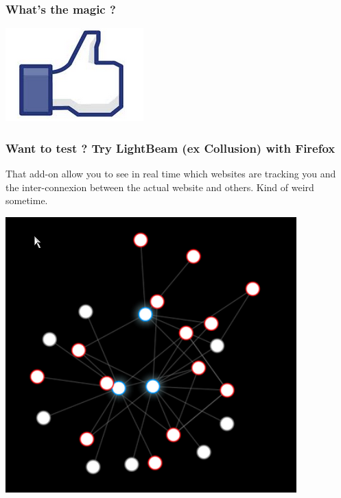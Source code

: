 \begin{frame}
\frametitle{What's the magic ?}

\begin{center}
\includegraphics[scale=0.3] {./materials/Facebook_like.png}
\end{center}
\end{frame}

\begin{frame}
\frametitle{Want to test ? Try LightBeam (ex Collusion) with Firefox}
That add-on allow you to see in real time which websites are tracking you
and the inter-connexion between the actual website and others. Kind of weird
sometime.
\begin{center}
\includegraphics[scale=0.3] {./materials/Collusion.png}
\end{center}
\end{frame}


